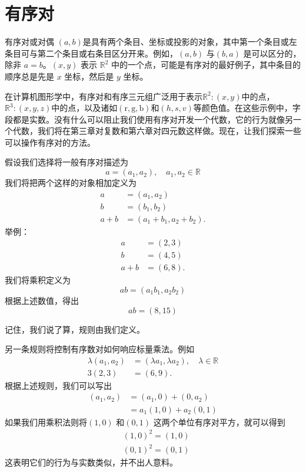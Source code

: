 \section{有序对}
有序对或对偶 $(a,b)$是具有两个条目、坐标或投影的对象，其中第一个条目或左条目可与第二个条目或右条目区分开来。例如，$(a, b)$ 与$(b, a)$ 是可以区分的，除非 $a=b$。$(x, y)$ 表示 $\mathbb{R}^{2}$ 中的一个点，可能是有序对的最好例子，其中条目的顺序总是先是 $x$ 坐标，然后是 $y$ 坐标。

在计算机图形学中，有序对和有序三元组广泛用于表示$\mathbb{R}^{2}:(x, y)$中的点，$\mathbb{R}^{3}:(x, y, z)$中的点，以及诸如$(\mathrm{r}, \mathrm{g}, \mathrm{b})$和$(h, s, v)$等颜色值。在这些示例中，字段都是实数。没有什么可以阻止我们使用有序对开发一个代数，它的行为就像另一个代数，我们将在第三章对复数和第六章对四元数这样做。现在，让我们探索一些可以操作有序对的方法。

假设我们选择将一般有序对描述为
$$
    a=\left(a_{1}, a_{2}\right), \quad a_{1}, a_{2} \in \mathbb{R}
$$
我们将把两个这样的对象相加定义为
$$
    \begin{aligned}
        a   & =\left(a_{1}, a_{2}\right)               \\
        b   & =\left(b_{1}, b_{2}\right)               \\
        a+b & =\left(a_{1}+b_{1}, a_{2}+b_{2}\right) .
    \end{aligned}
$$
举例：
$$
    \begin{aligned}
        a   & =(2,3)   \\
        b   & =(4,5)   \\
        a+b & =(6,8) .
    \end{aligned}
$$
我们将乘积定义为
$$
    a b=\left(a_{1} b_{1}, a_{2} b_{2}\right)
$$
根据上述数值，得出
$$
    a b=(8,15)
$$

记住，我们说了算，规则由我们定义。

另一条规则将控制有序数对如何响应标量乘法。例如
$$
    \begin{aligned}
        \lambda\left(a_{1}, a_{2}\right) & =\left(\lambda a_{1}, \lambda a_{2}\right), \quad \lambda \in \mathbb{R} \\
        3(2,3)                           & =(6,9) .
    \end{aligned}
$$
根据上述规则，我们可以写出
$$
    \begin{aligned}
        \left(a_{1}, a_{2}\right) & =\left(a_{1}, 0\right)+\left(0, a_{2}\right) \\
                                  & =a_{1}(1,0)+a_{2}(0,1)
    \end{aligned}
$$
如果我们用乘积法则将$(1,0)$ 和$(0,1)$ 这两个单位有序对平方，就可以得到
$$
    \begin{aligned}
         & (1,0)^{2}=(1,0) \\
         & (0,1)^{2}=(0,1)
    \end{aligned}
$$
这表明它们的行为与实数类似，并不出人意料。

